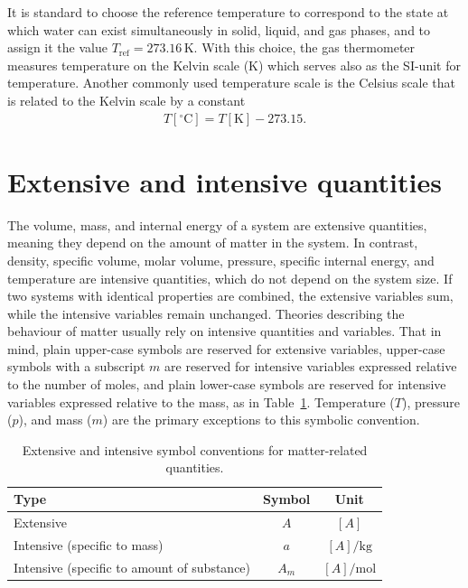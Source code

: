 It is standard to choose the reference temperature to correspond to the state at which water can exist simultaneously in solid, liquid, and gas phases, and to assign it the value $T_\text{ref} = 273.16\,\mathrm{K}$. With this choice, the gas thermometer measures temperature on the Kelvin scale (K) which serves also as the SI-unit for temperature. Another commonly used temperature scale is the Celsius scale that is related to the Kelvin scale by a constant
\begin{align}
    T[^\circ\text{C}]=T[\text{K}]-273.15.
\end{align}

\section{Extensive and intensive quantities}
The volume, mass, and internal energy of a system are extensive quantities, meaning they depend on the amount of matter in the system. In contrast, density, specific volume, molar volume, pressure, specific internal energy, and temperature are intensive quantities, which do not depend on the system size. If two systems with identical properties are combined, the extensive variables sum, while the intensive variables remain unchanged. Theories describing the behaviour of matter usually rely on intensive quantities and variables. That in mind, plain upper-case symbols are reserved for extensive variables, upper-case symbols with a subscript $m$ are reserved for intensive variables expressed relative to the number of moles, and plain lower-case symbols are reserved for intensive variables expressed relative to the mass, as in Table~\ref{tab:intensive-extensive-convention}. Temperature ($T$), pressure ($p$), and mass ($m$) are the primary exceptions to this symbolic convention.
\begin{table}[!htb]
    \centering
    \begin{threeparttable}
    \caption{Extensive and intensive symbol conventions for matter-related quantities.}
    \begin{tabular}{lcc}
         \toprule 
         Type & Symbol & Unit\\
         \midrule 
         Extensive & $A$ & $[A]$\\
         Intensive (specific to mass) & $a$ & $[A]/\text{kg}$\\
         Intensive (specific to amount of substance) & $A_m$ & $[A]/\text{mol}$\\
         \bottomrule
    \end{tabular}
    \end{threeparttable}
    \label{tab:intensive-extensive-convention}
\end{table}

